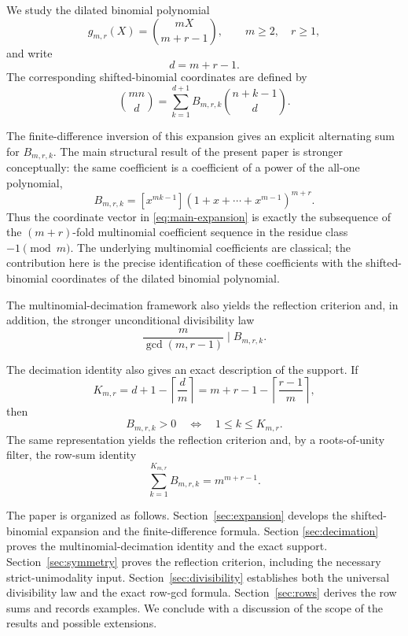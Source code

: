 \documentclass[11pt]{article}
\theoremstyle{definition}
\theoremstyle{remark}
\begin{document}
We study the dilated binomial polynomial
\[
 g_{m,r}(X)=\binom{mX}{m+r-1},
 \qquad m\ge2,\quad r\ge1,
\]
and write
\[
 d=m+r-1.
\]
The corresponding shifted-binomial coordinates are defined by
\begin{equation}
 \label{eq:main-expansion}
 \binom{mn}{d}
 =
 \sum_{k=1}^{d+1}B_{m,r,k}\binom{n+k-1}{d}.
\end{equation}

The finite-difference inversion of this expansion gives an explicit
alternating sum for $B_{m,r,k}$. The main structural result of the present
paper is stronger conceptually: the same coefficient is a coefficient of a
power of the all-one polynomial,
\begin{equation}
 \label{eq:main-decimation}
 B_{m,r,k}
 =
 [x^{mk-1}](1+x+\cdots+x^{m-1})^{m+r}.
\end{equation}
Thus the coordinate vector in \eqref{eq:main-expansion} is exactly the
subsequence of the $(m+r)$-fold multinomial coefficient sequence in the
residue class $-1\pmod m$. The underlying multinomial coefficients are
classical; the contribution here is the precise identification of these
coefficients with the shifted-binomial coordinates of the dilated binomial
polynomial.

The multinomial-decimation framework also yields the reflection criterion
and, in addition, the stronger unconditional divisibility law
\begin{equation}
\label{eq:main-div}
\frac{m}{\gcd(m,r-1)}\mid B_{m,r,k}.
\end{equation}

The decimation identity also gives an exact description of the support.
If
\[
 K_{m,r}=d+1-\left\lceil\frac dm\right\rceil
 =m+r-1-\left\lceil\frac{r-1}{m}\right\rceil,
\]
then
\[
 B_{m,r,k}>0\quad\Longleftrightarrow\quad 1\le k\le K_{m,r}.
\]
The same representation yields the reflection criterion and, by a
roots-of-unity filter, the row-sum identity
\[
 \sum_{k=1}^{K_{m,r}}B_{m,r,k}=m^{m+r-1}.
\]

The paper is organized as follows. Section~\ref{sec:expansion} develops the
shifted-binomial expansion and the finite-difference formula. Section
\ref{sec:decimation} proves the multinomial-decimation identity and the exact
support. Section~\ref{sec:symmetry} proves the reflection criterion, including
the necessary strict-unimodality input. Section~\ref{sec:divisibility}
establishes both the universal divisibility law and the exact row-gcd formula.
Section~\ref{sec:rows} derives the row sums and records examples. We conclude
with a discussion of the scope of the results and possible extensions.
\end{document}
